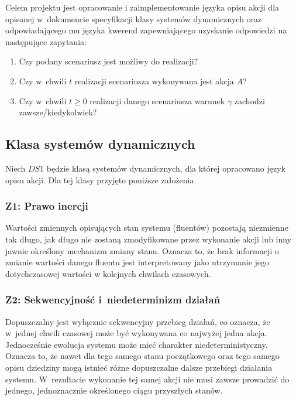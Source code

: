 \documentclass[12pt,a4paper]{article}
\begin{document}
Celem projektu jest opracowanie i zaimplementowanie języka opisu akcji dla opisanej w~dokumencie specyfikacji klasy systemów dynamicznych oraz odpowiadającego mu języka kwerend zapewniającego uzyskanie odpowiedzi na następujące zapytania:

\begin{enumerate}[label=\arabic*.]
    \item Czy podany scenariusz jest możliwy do realizacji?
    \item Czy w~chwili $t$ realizacji scenariusza wykonywana jest akcja $A$?
    \item Czy w~chwili $t \geq 0$ realizacji danego scenariusza warunek $\gamma$ zachodzi zawsze/kiedykolwiek?
\end{enumerate}

\subsection{Klasa systemów dynamicznych}


Niech $DS1$ będzie klasą systemów dynamicznych, dla której opracowano język opisu akcji. Dla tej klasy przyjęto poniższe założenia.



\subsubsection*{Z1: Prawo inercji}

Wartości zmiennych opisujących stan systemu (fluentów) pozostają niezmienne tak długo, jak długo nie zostaną zmodyfikowane przez wykonanie akcji lub inny jawnie określony mechanizm zmiany stanu. Oznacza to, że brak informacji o zmianie wartości danego fluentu jest interpretowany jako utrzymanie jego dotychczasowej wartości w kolejnych chwilach czasowych.

\subsubsection*{Z2: Sekwencyjność i~niedeterminizm działań}

Dopuszczalny jest wyłącznie sekwencyjny przebieg działań, co oznacza, że w~jednej chwili czasowej może być wykonywana co najwyżej jedna akcja. Jednocześnie ewolucja systemu może mieć charakter niedeterministyczny. Oznacza to, że nawet dla tego samego stanu początkowego oraz tego samego opisu dziedziny mogą istnieć różne dopuszczalne dalsze przebiegi działania systemu. W~rezultacie wykonanie tej samej akcji nie musi zawsze prowadzić do jednego, jednoznacznie określonego ciągu przyszłych stanów.
\end{document}
